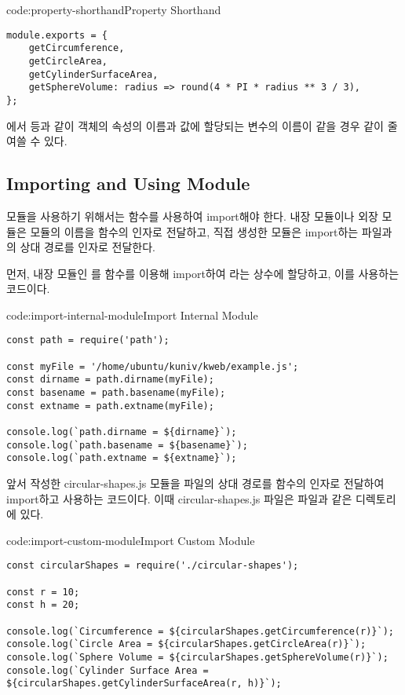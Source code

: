 \begin{codeenv}{code:property-shorthand}{Property Shorthand}\begin{verbatim}
module.exports = {
    getCircumference,
    getCircleArea,
    getCylinderSurfaceArea,
    getSphereVolume: radius => round(4 * PI * radius ** 3 / 3),
};
\end{verbatim}
\end{codeenv}

에서  등과 같이 객체의 속성의 이름과 값에 할당되는 변수의 이름이 같을 경우 \와 같이 줄여쓸 수 있다.
\newpage

\subsection*{Importing and Using Module}

모듈을 사용하기 위해서는  함수를 사용하여 import해야 한다. 내장 모듈이나 외장 모듈은 모듈의 이름을  함수의 인자로 전달하고, 직접 생성한 모듈은 import하는 파일과의 상대 경로를 인자로 전달한다.

먼저, \은 내장 모듈인 를  함수를 이용해 import하여 라는 상수에 할당하고, 이를 사용하는 코드이다.

\begin{codeenv}{code:import-internal-module}{Import Internal Module}\begin{verbatim}
const path = require('path');

const myFile = '/home/ubuntu/kuniv/kweb/example.js';
const dirname = path.dirname(myFile);
const basename = path.basename(myFile);
const extname = path.extname(myFile);

console.log(`path.dirname = ${dirname}`);
console.log(`path.basename = ${basename}`);
console.log(`path.extname = ${extname}`);
\end{verbatim}
\end{codeenv}

\은 앞서 작성한 circular-shapes.js 모듈을 파일의 상대 경로를  함수의 인자로 전달하여 import하고 사용하는 코드이다. 이때 circular-shapes.js 파일은  파일과 같은 디렉토리에 있다.

\begin{codeenv}{code:import-custom-module}{Import Custom Module }\begin{verbatim}
const circularShapes = require('./circular-shapes');

const r = 10;
const h = 20;

console.log(`Circumference = ${circularShapes.getCircumference(r)}`);
console.log(`Circle Area = ${circularShapes.getCircleArea(r)}`);
console.log(`Sphere Volume = ${circularShapes.getSphereVolume(r)}`);
console.log(`Cylinder Surface Area = ${circularShapes.getCylinderSurfaceArea(r, h)}`);
\end{verbatim}
\end{codeenv}

